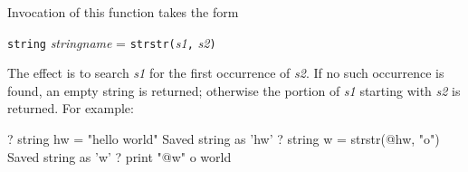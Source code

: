 Invocation of this function takes the form

\texttt{string} \textsl{stringname} = 
\texttt{strstr(}\textsl{s1}\texttt{,} \textsl{s2}\texttt{)}

The effect is to search \textsl{s1} for the first occurrence of
\textsl{s2}.  If no such occurrence is found, an empty string is
returned; otherwise the portion of \textsl{s1} starting with
\textsl{s2} is returned.  For example:
%
\begin{code}
? string hw = "hello world"
Saved string as 'hw'
? string w = strstr(@hw, "o")
Saved string as 'w'
? print "@w"
o world
\end{code}
%


    

